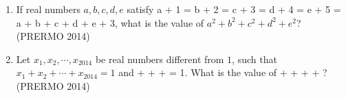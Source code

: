 \begin{enumerate}
\item If real numbers $a, b, c, d, e$ satisfy a + 1 = b + 2 = c + 3 = d + 4 = e + 5 = a + b + c + d + e + 3, what is the value of $a^2 + b^2 + c^2 + d^2 + e^2$?\hfill(PRERMO 2014)
\item Let $x_1, x_2, \cdots, x_{2014}$ be real numbers different from $1$, such that$x_1 + x_2 + \cdots + x_{2014} = 1$ and  +  + \cdots +  = 1. What is the value of   +  +  + \cdots + ?\hfill(PRERMO 2014)
\end{enumerate}
